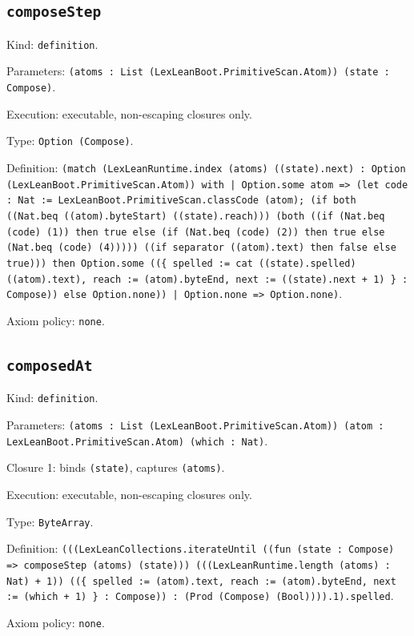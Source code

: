 \documentclass[11pt]{article}
\begin{document}
\subsection*{\texttt{composeStep}}
\noindent Kind: \texttt{definition}.\par
\noindent Parameters: \texttt{(atoms : List (LexLeanBoot.PrimitiveScan.Atom)) (state : Compose)}.\par
\noindent Execution: executable, non-escaping closures only.\par
\noindent Type: \texttt{Option (Compose)}.\par
\noindent Definition: \texttt{(match (LexLeanRuntime.index (atoms) ((state).next) : Option (LexLeanBoot.PrimitiveScan.Atom)) with | Option.some atom => (let code : Nat := LexLeanBoot.PrimitiveScan.classCode (atom); (if both ((Nat.beq ((atom).byteStart) ((state).reach))) (both ((if (Nat.beq (code) (1)) then true else (if (Nat.beq (code) (2)) then true else (Nat.beq (code) (4))))) ((if separator ((atom).text) then false else true))) then Option.some ((\{ spelled := cat ((state).spelled) ((atom).text), reach := (atom).byteEnd, next := ((state).next + 1) \} : Compose)) else Option.none)) | Option.none => Option.none)}.\par
\noindent Axiom policy: \texttt{none}.\par
\subsection*{\texttt{composedAt}}
\noindent Kind: \texttt{definition}.\par
\noindent Parameters: \texttt{(atoms : List (LexLeanBoot.PrimitiveScan.Atom)) (atom : LexLeanBoot.PrimitiveScan.Atom) (which : Nat)}.\par
\noindent Closure 1: binds \texttt{(state)}, captures \texttt{(atoms)}.\par
\noindent Execution: executable, non-escaping closures only.\par
\noindent Type: \texttt{ByteArray}.\par
\noindent Definition: \texttt{(((LexLeanCollections.iterateUntil ((fun (state : Compose) => composeStep (atoms) (state))) (((LexLeanRuntime.length (atoms) : Nat) + 1)) ((\{ spelled := (atom).text, reach := (atom).byteEnd, next := (which + 1) \} : Compose)) : (Prod (Compose) (Bool)))).1).spelled}.\par
\noindent Axiom policy: \texttt{none}.\par
\end{document}
